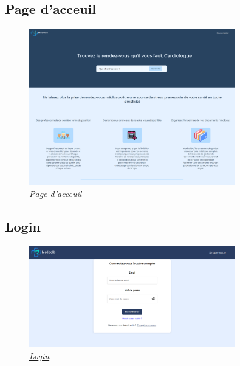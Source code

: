 \documentclass[a4paper]{report}
\begin{document}
\subsection{Page d'acceuil}
\begin{figure}[H]
    \vspace{-10pt}
    \centering
    \includegraphics[width=0.8\textwidth]{captures/page-acceuil.png}
    \caption{\textit{\hyperref[homepage]{Page d'acceuil}}}
    \label{fig:DCU10}
\end{figure}

\subsection{Login}
\begin{figure}[H]
    \vspace{-10pt}
    \centering
    \includegraphics[width=0.8\textwidth]{captures/login.png}
    \caption{\textit{\hyperref[login]{Login}}}
    \label{fig:DCU11}
\end{figure}
\end{document}
